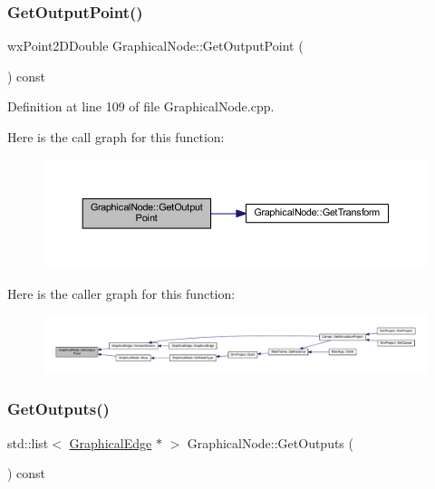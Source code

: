 \subsubsection{\texorpdfstring{Get\+Output\+Point()}{GetOutputPoint()}}
{\footnotesize\ttfamily wx\+Point2\+D\+Double Graphical\+Node\+::\+Get\+Output\+Point (\begin{DoxyParamCaption}{ }\end{DoxyParamCaption}) const\hspace{0.3cm}{\ttfamily [protected]}}



Definition at line 109 of file Graphical\+Node.\+cpp.

Here is the call graph for this function\+:
\nopagebreak
\begin{figure}[H]
\begin{center}
\leavevmode
\includegraphics[width=350pt]{class_graphical_node_a5e0a98450d511bb024e1746ab42d34c4_cgraph}
\end{center}
\end{figure}
Here is the caller graph for this function\+:
\nopagebreak
\begin{figure}[H]
\begin{center}
\leavevmode
\includegraphics[width=350pt]{class_graphical_node_a5e0a98450d511bb024e1746ab42d34c4_icgraph}
\end{center}
\end{figure}
\mbox{\label{class_graphical_node_a2d4169669b106f7351178e4fbc60be85}} 
\subsubsection{\texorpdfstring{Get\+Outputs()}{GetOutputs()}}
{\footnotesize\ttfamily std\+::list$<$ \hyperlink{class_graphical_edge}{Graphical\+Edge} $\ast$ $>$ Graphical\+Node\+::\+Get\+Outputs (\begin{DoxyParamCaption}{ }\end{DoxyParamCaption}) const}



